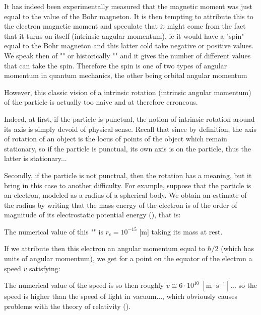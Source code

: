      It has indeed been experimentally measured that the magnetic moment was just equal to the value of the Bohr magneton. It is then tempting to attribute this to the electron magnetic moment and speculate that it might come from the fact that it turns on itself (intrinsic angular momentum), ie it would have a "spin" equal to the Bohr magneton and this latter cold take negative or positive values. We speak then of "" or historically "" and it gives the number of different values that can take the spin. Therefore the spin is one of two types of angular momentum in quantum mechanics, the other being orbital angular momentum

   However, this classic vision of a intrinsic rotation (intrinsic angular momentum) of the particle is actually too naive and at therefore erroneous.

    Indeed, at first, if the particle is punctual, the notion of intrinsic rotation around its axis is simply devoid of physical sense. Recall that since by definition, the axis of rotation of an object is the locus of points of the object which remain stationary, so if the particle is punctual, its own axis is on the particle, thus the latter is stationary...

   Secondly, if the particle is not punctual, then the rotation has a meaning, but it bring in this case to another difficulty. For example, suppose that the particle is an electron, modeled as a radius of a spherical body. We obtain an estimate of the radius by writing that the mass energy of the electron is of the order of magnitude of its electrostatic potential energy (), that is:
   
   The numerical value of this "" is $r_c=10^{-15}$ [m] taking its mass at rest.

    If we attribute then this electron an angular momentum equal to $\hbar/2$ (which has units of angular momentum), we get for a point on the equator of the electron a speed $v$ satisfying:
    
    The numerical value of the speed is so then roughly $v\cong 6\cdot 10^{10}\;[\text{m}\cdot \text{s}^{-1}]$... so the speed is higher than the speed of light in vacuum..., which obviously causes problems with the theory of relativity ().

